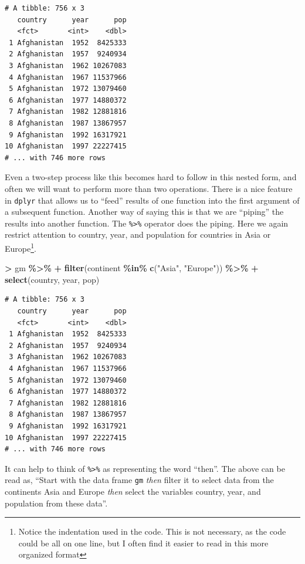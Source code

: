 \documentclass[
]{krantz}
\makeatletter
\newenvironment{Shaded}{\begin{snugshade}}{\end{snugshade}}
\newcommand{\KeywordTok}[1]{\textcolor[rgb]{0.27,0.27,0.27}{\textbf{#1}}}
\newcommand{\NormalTok}[1]{#1}
\newcommand{\OperatorTok}[1]{\textcolor[rgb]{0.43,0.43,0.43}{\textbf{#1}}}
\newcommand{\StringTok}[1]{\textcolor[rgb]{0.5,0.5,0.5}{#1}}
\newenvironment{kframe}{%
\medskip{}
\setlength{\fboxsep}{.8em}
 \def\at@end@of@kframe{}%
 \ifinner\ifhmode%
  \def\at@end@of@kframe{\end{minipage}}%
  \begin{minipage}{\columnwidth}%
 \fi\fi%
 \def\FrameCommand##1{\hskip\@totalleftmargin \hskip-\fboxsep
 \colorbox{shadecolor}{##1}\hskip-\fboxsep
     \hskip-\linewidth \hskip-\@totalleftmargin \hskip\columnwidth}%
 \MakeFramed {\advance\hsize-\width
   \@totalleftmargin\z@ \linewidth\hsize
   \@setminipage}}%
 {\par\unskip\endMakeFramed%
 \at@end@of@kframe}
\renewenvironment{Shaded}{\begin{kframe}}{\end{kframe}}
\makeatother
\begin{document}
\begin{verbatim}
# A tibble: 756 x 3
   country      year      pop
   <fct>       <int>    <dbl>
 1 Afghanistan  1952  8425333
 2 Afghanistan  1957  9240934
 3 Afghanistan  1962 10267083
 4 Afghanistan  1967 11537966
 5 Afghanistan  1972 13079460
 6 Afghanistan  1977 14880372
 7 Afghanistan  1982 12881816
 8 Afghanistan  1987 13867957
 9 Afghanistan  1992 16317921
10 Afghanistan  1997 22227415
# ... with 746 more rows
\end{verbatim}

Even a two-step process like this becomes hard to follow in this nested form, and often we will want to perform more than two operations. There is a nice feature in \texttt{dplyr} that allows us to ``feed'' results of one function into the first argument of a subsequent function. Another way of saying this is that we are ``piping'' the results into another function. The \texttt{\%\textgreater{}\%} operator does the piping. Here we again restrict attention to country, year, and population for countries in Asia or Europe\footnote{Notice the indentation used in the code. This is not necessary, as the code could be all on one line, but I often find it easier to read in this more organized format}.

\begin{Shaded}
\begin{Highlighting}[]
\OperatorTok{\textgreater{}}\StringTok{ }\NormalTok{gm }\OperatorTok{\%\textgreater{}\%}\StringTok{ }
\OperatorTok{+}\StringTok{   }\KeywordTok{filter}\NormalTok{(continent }\OperatorTok{\%in\%}\StringTok{ }\KeywordTok{c}\NormalTok{(}\StringTok{"Asia"}\NormalTok{, }\StringTok{"Europe"}\NormalTok{)) }\OperatorTok{\%\textgreater{}\%}\StringTok{ }
\OperatorTok{+}\StringTok{   }\KeywordTok{select}\NormalTok{(country, year, pop)}
\end{Highlighting}
\end{Shaded}

\begin{verbatim}
# A tibble: 756 x 3
   country      year      pop
   <fct>       <int>    <dbl>
 1 Afghanistan  1952  8425333
 2 Afghanistan  1957  9240934
 3 Afghanistan  1962 10267083
 4 Afghanistan  1967 11537966
 5 Afghanistan  1972 13079460
 6 Afghanistan  1977 14880372
 7 Afghanistan  1982 12881816
 8 Afghanistan  1987 13867957
 9 Afghanistan  1992 16317921
10 Afghanistan  1997 22227415
# ... with 746 more rows
\end{verbatim}

It can help to think of \texttt{\%\textgreater{}\%} as representing the word ``then''. The above can be read as, ``Start with the data frame \texttt{gm} \emph{then} filter it to select data from the continents Asia and Europe \emph{then} select the variables country, year, and population from these data''.
\end{document}
